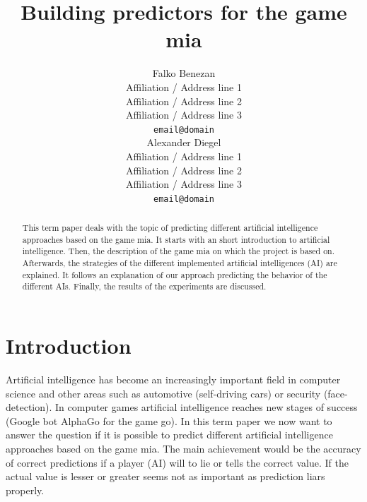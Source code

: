 \documentclass[11pt]{article}
\title{Building predictors for the game mia}
\author{Falko Benezan \\
  Affiliation / Address line 1 \\
  Affiliation / Address line 2 \\
  Affiliation / Address line 3 \\
  {\tt email@domain} \\\And
  Alexander Diegel \\
  Affiliation / Address line 1 \\
  Affiliation / Address line 2 \\
  Affiliation / Address line 3 \\
  {\tt email@domain} \\}
\date{}
\begin{document}
\maketitle
\begin{abstract}
  This term paper deals with the topic of predicting different artificial intelligence approaches based on the game mia. It starts with an short introduction to artificial intelligence. Then, the description of the game mia on which the project is based on. Afterwards, the strategies of the different implemented artificial intelligences (AI) are explained. It follows an explanation of our approach predicting the behavior of the different AIs. Finally, the results of the experiments are discussed.
\end{abstract}


\section{Introduction}
Artificial intelligence has become an increasingly important field in computer science and other areas such as automotive (self-driving cars) or security (face-detection).
In computer games artificial intelligence reaches new stages of success (Google bot AlphaGo for the game go). In this term paper we now want to answer the question if it is possible to predict different artificial intelligence approaches based on the game mia. The main achievement would be the accuracy of correct predictions if a player (AI) will to lie or tells the correct value. If the actual value is lesser or greater seems not as important as prediction liars properly. 
\end{document}
